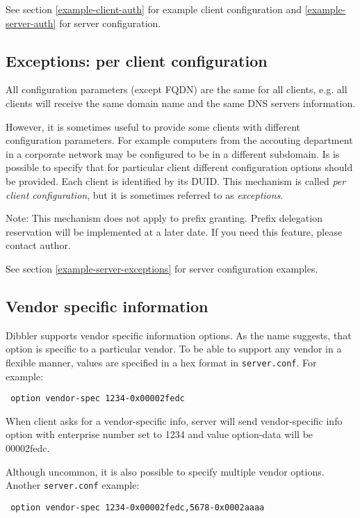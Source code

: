 See section \ref{example-client-auth} for example client configuration
and \ref{example-server-auth} for server configuration.

\subsection{Exceptions: per client configuration}
\label{feature-exceptions}
All configuration parameters (except FQDN) are the same for all
clients, e.g. all clients will receive the same domain name and the
same DNS servers information.

However, it is sometimes useful to provide some clients with different
configuration parameters. For example computers from the accouting
department in a corporate network may be configured to be in a
different subdomain. Is is possible to specify that for particular
client different configuration options should be provided. Each client
is identified by its DUID. This mechanism is called \emph{per client
  configuration}, but it is sometimes referred to as \emph{exceptions}.

Note: This mechanism does not apply to prefix granting. Prefix
delegation reservation will be implemented at a later date. If you
need this feature, please contact author.

See section \ref{example-server-exceptions} for server configuration
examples.

\subsection{Vendor specific information}
\label{feature-vendor-spec}
Dibbler supports vendor specific information options. As the name
suggests, that option is specific to a particular vendor. To be able
to support any vendor in a flexible manner, values are specified in a
hex format in \verb+server.conf+. For example:

\begin{lstlisting}
 option vendor-spec 1234-0x00002fedc
\end{lstlisting}

When client asks for a vendor-specific info, server will send
vendor-specific info option with enterprise number set to 1234 and
value option-data will be 00002fedc.

Although uncommon, it is also possible to specify multiple vendor
options. Another \verb+server.conf+ example:

\begin{lstlisting}
 option vendor-spec 1234-0x00002fedc,5678-0x0002aaaa
\end{lstlisting}

